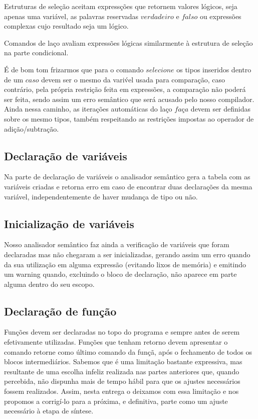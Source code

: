 \documentclass[a4paper,12pt]{report}
\begin{document}
Estruturas de sele\c{c}\~ao aceitam express\c{c}\~oes que retornem valores l\'ogicos, seja 
apenas uma vari\'avel, as palavras reservadas $verdadeiro$ e $falso$ ou express\~oes complexas
cujo resultado seja um l\'ogico.

Comandos de la\c{c}o avaliam express\~oes l\'ogicas similarmente \`a estrutura de sele\c{c}\~ao
na parte condicional.

\'E de bom tom frizarmos que para o comando $selecione$ os tipos inseridos dentro de um $caso$ 
devem ser o mesmo da vari\'vel usada para compara\c{c}\~ao, caso contr\'ario, pela pr\'opria 
restri\c{c}\~ao feita em express\~oes, a compara\c{c}\~ao n\~ao poder\'a ser feita, sendo assim 
um erro sem\^antico que ser\'a acusado pelo nosso compilador. Ainda nessa caminho, as 
itera\c{c}\~oes autom\'aticas do la\c{c}o $fa$\c{c}$a$ devem ser definidas sobre os mesmo
tipos, tamb\'em respeitando as restri\c{c}\~oes impostas ao operador de 
adi\c{c}\~ao/subtra\c{c}\~ao.

\subsection{Declara\c{c}\~ao de vari\'aveis}

Na parte de declara\c{c}\~ao de vari\'aveis o analisador sem\^antico gera a tabela com as 
vari\'aveis criadas e retorna erro em caso de encontrar duas declara\c{c}\~oes da mesma
vari\'avel, independentemente de haver mudan\c{c}a de tipo ou n\~ao.

\subsection{Inicializa\c{c}\~ao de vari\'aveis}

Nosso analisador sem\^antico faz ainda a verifica\c{c}\~ao de vari\'aveis que foram declaradas
mas n\~ao chegaram a ser inicializadas, gerando assim um erro quando da sua utiliza\c{c}\~ao em
alguma express\~ao (evitando lixos de mem\'oria) e emitindo um warning quando, excluindo o 
bloco de declara\c{c}\~ao, n\~ao aparece em parte alguma dentro do seu escopo.

\subsection{Declara\c{c}\~ao de fun\c{c}\~ao}

Fun\c{c}\~oes devem ser declaradas no topo do programa e sempre antes de serem efetivamente
utilizadas. Fun\c{c}\~oes que tenham retorno devem apresentar o comando retorne como \'ultimo
comando da fun\c{c}\~a, ap\'os o fechamento de todos os blocos intermedi\'arios.
Sabemos que \'e uma limita\c{c}\~ao bastante expressiva, mas resultante de uma escolha infeliz
realizada nas partes anteriores que, quando percebida, n\~ao dispunha mais de tempo h\'abil 
para que os ajustes necess\'arios fossem realizados. Assim, nesta entrega o deixamos com essa
limita\c{c}\~ao e nos propomos a corrig\'i-lo para a pr\'oxima, e definitiva, parte como um 
ajuste necess\'ario \`a etapa de s\'intese.
\end{document}
